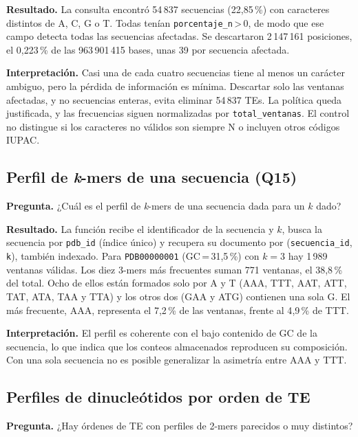 \textbf{Resultado.} La consulta encontró 54\,837 secuencias (22{,}85\,\%)
con caracteres distintos de A, C, G o T. Todas tenían
\texttt{porcentaje\_n}\,>\,0, de modo que ese campo detecta todas las
secuencias afectadas. Se descartaron 2\,147\,161 posiciones, el
0{,}223\,\% de las 963\,901\,415 bases, unas 39 por secuencia afectada.
 
\textbf{Interpretación.} Casi una de cada cuatro secuencias tiene al
menos un carácter ambiguo, pero la pérdida de información es mínima.
Descartar solo las ventanas afectadas, y no secuencias enteras, evita
eliminar 54\,837 TEs. La política queda justificada, y las frecuencias
siguen normalizadas por \texttt{total\_ventanas}. El control no distingue
si los caracteres no válidos son siempre N o incluyen otros códigos IUPAC.
 
\subsection{Perfil de \textit{k}-mers de una secuencia (Q15)}
 
\textbf{Pregunta.} ¿Cuál es el perfil de \textit{k}-mers de una secuencia
dada para un $k$ dado?
 
\textbf{Resultado.} La función recibe el identificador de la secuencia y
$k$, busca la secuencia por \texttt{pdb\_id} (índice único) y recupera su
documento por (\texttt{secuencia\_id}, \texttt{k}), también indexado. Para
\texttt{PDB00000001} (GC\,=\,31{,}5\,\%) con $k=3$ hay 1\,989 ventanas
válidas. Los diez 3-mers más frecuentes suman 771 ventanas, el
38{,}8\,\% del total. Ocho de ellos están formados solo por A y T (AAA,
TTT, AAT, ATT, TAT, ATA, TAA y TTA) y los otros dos (GAA y ATG)
contienen una sola G. El más frecuente, AAA, representa el 7{,}2\,\% de
las ventanas, frente al 4{,}9\,\% de TTT.
 
\textbf{Interpretación.} El perfil es coherente con el bajo contenido de
GC de la secuencia, lo que indica que los conteos almacenados reproducen
su composición. Con una sola secuencia no es posible generalizar la
asimetría entre AAA y TTT.
 
\subsection{Perfiles de dinucleótidos por orden de TE}
 
\textbf{Pregunta.} ¿Hay órdenes de TE con perfiles de 2-mers parecidos o
muy distintos?
 
